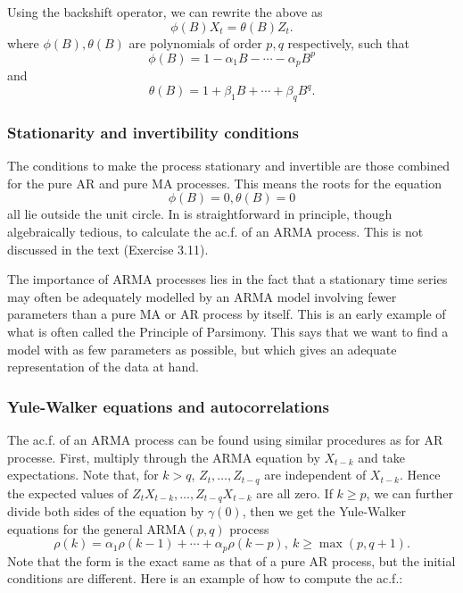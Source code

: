 Using the backshift operator, we can rewrite the above as
\[ \phi(B)X_t = \theta(B) Z_t. \]
where $\phi(B), \theta(B)$ are polynomials of order $p,q$ respectively, such that 
\[ \phi(B) = 1 - \alpha_1 B - \cdots - \alpha_p B^p \]
and 
\[ \theta(B) = 1 + \beta_1 B + \cdots + \beta_q B^q. \]


\subsubsection{Stationarity and invertibility conditions}
The conditions to make the process stationary and invertible are those combined for the pure AR and pure MA 
processes. This means the roots for the equation 
\[ \phi(B) = 0, \theta(B) = 0 \]
all lie outside the unit circle. In is straightforward in principle, though algebraically tedious, to calculate 
the ac.f. of an ARMA process. This is not discussed in the text (Exercise 3.11).

The importance of ARMA processes lies in the fact that a stationary time series may often be adequately modelled 
by an ARMA model involving fewer parameters than a pure MA or AR process by itself. This is an early example of
what is often called the Principle of Parsimony. This says that we want to find a model with as few parameters 
as possible, but which gives an adequate representation of the data at hand.


\subsubsection{Yule-Walker equations and autocorrelations}
The ac.f. of an ARMA process can be found using similar procedures as for AR processe. First, multiply through 
the ARMA equation by $X_{t-k}$ and take expectations. Note that, for $k > q$, $Z_t, \dots, Z_{t-q}$ are 
independent of $X_{t-k}$. Hence the expected values of $Z_tX_{t-k}, \dots, Z_{t-q}X_{t-k}$ are all zero. 
If $k \geq p$, we can further divide both sides of the equation by $\gamma(0)$, then we get the Yule-Walker 
equations for the general $\mathrm{ARMA}(p, q)$ process
\[ \rho(k) = \alpha_1 \rho(k-1) + \cdots + \alpha_p \rho(k - p), \ k \geq \max_{}(p, q + 1). \]
Note that the form is the exact same as that of a pure AR process, but the initial conditions are different. 
Here is an example of how to compute the ac.f.:

